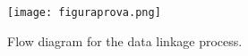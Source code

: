 	\begin{figure}[h]
			\centering	
			\texttt{[image: figuraprova.png]}	
		\caption{Flow diagram for the data linkage process.}
	\label{fig:quelcom}
	\end{figure}	